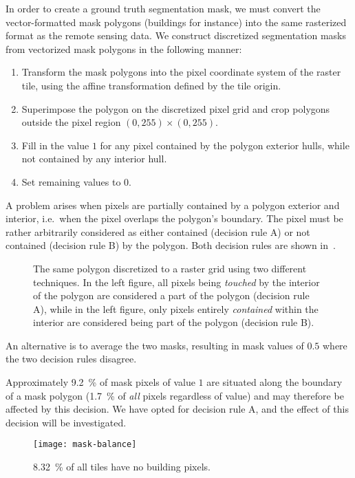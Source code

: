 In order to create a ground truth segmentation mask, we must convert the vector-formatted mask polygons (buildings for instance) into the same rasterized format as the remote sensing data.
We construct discretized segmentation masks from vectorized mask polygons in the following manner:

\begin{enumerate}[label=\textbf{\arabic*}]
  \item Transform the mask polygons into the pixel coordinate system of the raster tile, using the affine transformation defined by the tile origin.
  \item Superimpose the polygon on the discretized pixel grid and crop polygons outside the pixel region $(0, 255) \times (0, 255)$.
  \item Fill in the value $1$ for any pixel contained by the polygon exterior hulls, while not contained by any interior hull.
  \item Set remaining values to $0$.
\end{enumerate}

A problem arises when pixels are partially contained by a polygon exterior and interior, i.e.\ when the pixel overlaps the polygon's boundary.
The pixel must be rather arbitrarily considered as either contained (decision rule A) or not contained (decision rule B) by the polygon.
Both decision rules are shown in~.

\begin{figure}[H]
  \centering
  
  \hspace{2em}
  
  \caption{%
    The same polygon discretized to a raster grid using two different techniques.
    In the left figure, all pixels being \textit{touched} by the interior of the polygon
    are considered a part of the polygon (decision rule A), while in the left figure, only pixels
    entirely \textit{contained} within the interior are considered being part
    of the polygon (decision rule B).
  }%
  \label{fig:pixel-containment}
\end{figure}

An alternative is to average the two masks, resulting in mask values of $0.5$ where the two decision rules disagree.

Approximately \SI{9.2}{\percent} of mask pixels of value $1$ are situated along the boundary of a mask polygon (\SI{1.7}{\percent} of \textit{all} pixels regardless of value) and may therefore be affected by this decision.
We have opted for decision rule A, and the effect of this decision will be investigated.

\begin{figure}[H]
  \centering
  \texttt{[image: mask-balance]}
  \caption{%
    \SI{8.32}{\percent} of all tiles have no building pixels.
  }
\end{figure}

